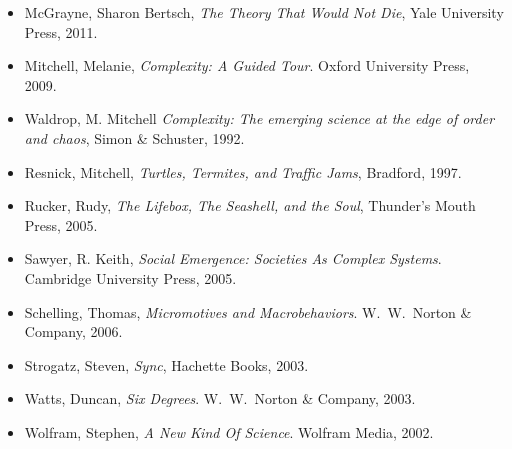 \documentclass[12pt]{book}
\theoremstyle{exercise}
\newcommand\blankpage{%
    \null
    \thispagestyle{empty}%
    \addtocounter{page}{-1}%
    \newpage}
\begin{document}
\begin{itemize}
\item  McGrayne, Sharon Bertsch, {\it The Theory That Would Not Die}, Yale University Press, 2011.

\item Mitchell, Melanie, {\it  Complexity: A Guided Tour}.
Oxford University Press, 2009.

\item Waldrop, M. Mitchell {\it Complexity: The emerging science at the edge of order and chaos},
Simon \& Schuster, 1992.

\item Resnick, Mitchell, {\it  Turtles, Termites, and Traffic Jams},
Bradford, 1997.

\item Rucker, Rudy, {\it  The Lifebox, The Seashell, and the Soul},
Thunder's Mouth Press, 2005.

\item Sawyer, R. Keith, {\it  Social Emergence: Societies As Complex Systems}.
Cambridge University Press, 2005.

\item Schelling, Thomas, {\it  Micromotives and Macrobehaviors}.
W.~W.~Norton \& Company, 2006.

\item Strogatz, Steven, {\it  Sync},
Hachette Books, 2003.

\item Watts, Duncan, {\it  Six Degrees}.
W.~W.~Norton \& Company, 2003.

\item Wolfram, Stephen, {\it  A New Kind Of Science}.
Wolfram Media, 2002.

\end{itemize}



\backmatter
\printindex

\afterpage{\blankpage}
\end{document}
